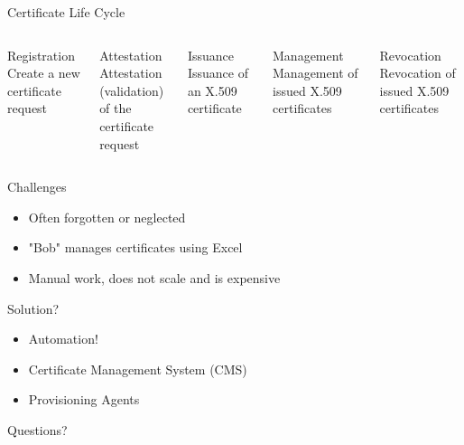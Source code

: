 \documentclass[aspectratio=169]{beamer}
\begin{document}
    \begin{frame}{Certificate Life Cycle}
        \begin{columns}[T,onlytextwidth]
            \begin{exampleblock}{Registration}
                Create a new certificate request
            \end{exampleblock}
            \begin{exampleblock}{Attestation}
                Attestation (validation) of the \\ certificate request
            \end{exampleblock}
            \begin{exampleblock}{Issuance}
                Issuance of an X.509 certificate
            \end{exampleblock}
            \begin{exampleblock}{Management}
                Management of issued X.509 certificates
            \end{exampleblock}
            \begin{exampleblock}{Revocation}
                Revocation of issued X.509 certificates
            \end{exampleblock}
        \end{columns}
    \end{frame}

    \begin{frame}{Challenges}
        \begin{itemize}
            \item Often forgotten or neglected
            \pause
            \item "Bob" manages certificates using \alert{Excel}
            \pause
            \item Manual work, does not scale and is expensive
        \end{itemize}
    \end{frame}

    \begin{frame}{Solution?}
        \begin{itemize}
            \item Automation!
            \pause
            \item Certificate Management System (CMS)
            \pause
            \item Provisioning Agents
        \end{itemize}
    \end{frame}

    \begin{frame}[standout]
        Questions?
    \end{frame}
\end{document}

